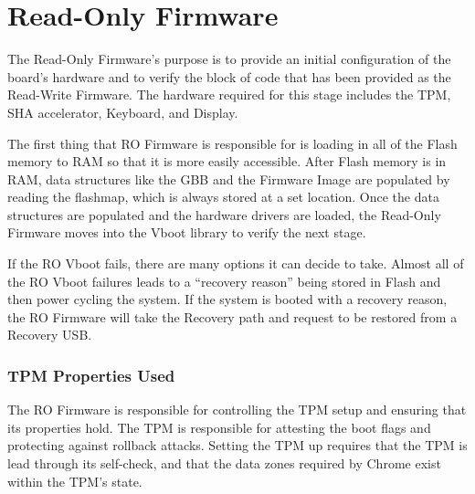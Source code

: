 \documentclass[../report.tex]{subfiles}
\begin{document}
\doublespacing

\section{Read-Only Firmware}

The Read-Only Firmware's purpose is to provide an initial configuration of the board's hardware and to verify the block of code that has been provided as the Read-Write Firmware.
The hardware required for this stage includes the TPM, SHA accelerator, Keyboard, and Display.


The first thing that RO Firmware is responsible for is loading in all of the Flash memory to RAM so that it is more easily accessible. 
After Flash memory is in RAM, data structures like the GBB and the Firmware Image are populated by reading the flashmap, which is always stored at a set location.
Once the data structures are populated and the hardware drivers are loaded, the Read-Only Firmware moves into the Vboot library to verify the next stage.


If the RO Vboot fails, there are many options it can decide to take.
Almost all of the RO Vboot failures leads to a ``recovery reason'' being stored in Flash and then power cycling the system.
If the system is booted with a recovery reason, the RO Firmware will take the Recovery path and request to be restored from a Recovery USB. %

\subsubsection{TPM Properties Used}

The RO Firmware is responsible for controlling the TPM setup and ensuring that its properties hold. 
The TPM is responsible for attesting the boot flags and protecting against rollback attacks. 
Setting the TPM up requires that the TPM is lead through its self-check, and that the data zones required by Chrome exist within the TPM's state.
\end{document}
